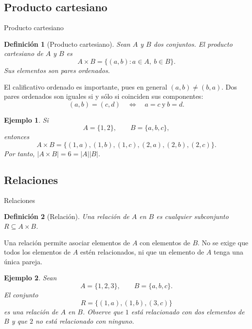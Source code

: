 \documentclass[aspectratio=169,10pt]{beamer}
\newtheorem{definicion}{Definición}
\newtheorem{ejemplo}{Ejemplo}
\begin{document}
\subsection*{Producto cartesiano}
\begin{frame}{Producto cartesiano}


\begin{definicion}[Producto cartesiano]
Sean $A$ y $B$ dos conjuntos. El \emph{producto cartesiano} de $A$ y $B$ es
\[
A\times B=\{(a,b):a\in A,\ b\in B\}.
\]
Sus elementos son pares ordenados.
\end{definicion}

El calificativo ordenado es importante, pues en general $(a,b)\neq(b,a)$.
Dos pares ordenados son iguales si y sólo si coinciden sus componentes:
\[
(a,b)=(c,d)
\quad\Longleftrightarrow\quad
a=c\ \text{y}\ b=d.
\]

\begin{ejemplo}
Si
\[
A=\{1,2\},\qquad B=\{a,b,c\},
\]
entonces
\[
A\times B=
\{(1,a),(1,b),(1,c),(2,a),(2,b),(2,c)\}.
\]
Por tanto, $|A\times B|=6=|A||B|$.
\end{ejemplo}

\end{frame}
\subsection*{Relaciones}
\begin{frame}{Relaciones}

\begin{definicion}[Relación]
Una relación de $A$ en $B$ es cualquier subconjunto $R\subseteq A\times B$.
\end{definicion}

Una relación permite asociar elementos de $A$ con elementos de $B$. No se
exige que todos los elementos de $A$ estén relacionados, ni que un elemento de $A$ tenga una única pareja.

\begin{ejemplo}
Sean
\[
A=\{1,2,3\},\qquad B=\{a,b,c\}.
\]
El conjunto
\[
R=\{(1,a),(1,b),(3,c)\}
\]
es una relación de $A$ en $B$. Observe que $1$ está relacionado con dos
elementos de $B$ y que $2$ no está relacionado con ninguno.
\end{ejemplo}


\end{frame}
\end{document}
